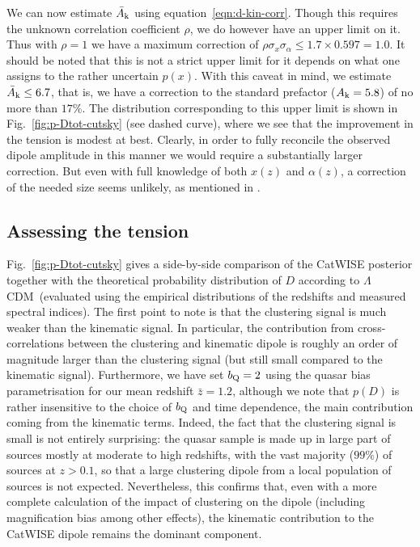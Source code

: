 \documentclass[fleqn,usenatbib]{mnras}
\def\LCDM{$\Lambda$CDM}
\def\qso{{\rm{Q}}}
\def\bqso{b_\qso}
\def\kin{{\rm k}}
\def\ckin{A_\kin}
\def\Dtot{D}
\begin{document}
We can now estimate $\bar{A}_\kin$ using equation~\eqref{eqn:d-kin-corr}.
Though this requires the unknown correlation coefficient $\rho$,
we do however have an upper limit on it. Thus with $\rho=1$ we have
a maximum correction of $\rho\sigma_x\sigma_\alpha\leq1.7\times0.597=1.0$.
It should be noted that this is not a strict upper limit for it depends
on what one assigns to the rather uncertain $p(x)$.
With this caveat in mind, we estimate
$\bar{A}_\kin\leq6.7$, that is, we have a
correction to the standard prefactor ($\ckin=5.8$)
of no more than $17\%$. The distribution corresponding
to this upper limit is shown in Fig.~\ref{fig:p-Dtot-cutsky}
(see dashed curve), where we see that
the improvement in the tension is modest at best.
Clearly, in order to fully reconcile the observed
dipole amplitude in this manner we would
require a substantially larger correction.
But even with full knowledge of
both $x(z)$ and $\alpha(z)$, a correction of the needed size
seems unlikely, as mentioned in \citet{2022MNRAS.512.3895D}. 



\subsection{Assessing the tension}\label{sec:numerical-results}
Fig.~\ref{fig:p-Dtot-cutsky} gives a side-by-side comparison of the
CatWISE posterior together with the theoretical probability
distribution of $\Dtot$ according to \LCDM\ (evaluated using the
empirical distributions of the redshifts and measured spectral indices).
The first point to note is that the clustering signal is much
weaker than
the kinematic signal. In particular, the contribution from
cross-correlations between the clustering and kinematic dipole
is roughly an order of magnitude larger than the clustering
signal (but still small compared to the kinematic signal).
Furthermore, we have set $\bqso=2$ using the
    \citet{2005MNRAS.356..415C} quasar bias parametrisation for our mean redshift
    $\bar{z}=1.2$, although we note that $p(\Dtot)$ is rather
    insensitive to the choice of $\bqso$ and time dependence, the main contribution coming from the kinematic terms.
Indeed, the fact that the clustering signal is small is not entirely
surprising: the quasar sample is made up  in large part of
sources mostly at moderate to high redshifts, with the vast majority ($99\%$) of sources
at $z>0.1$, so that a large clustering dipole from a local
population of sources is not expected.
Nevertheless, this confirms that, even with a more complete calculation of
the impact of clustering on the dipole (including magnification bias
among other effects), the kinematic contribution to the CatWISE dipole
remains the dominant component.
\end{document}
